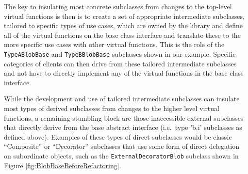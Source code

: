 \documentclass[pdf,ps2pdf,11pt]{SANDreport}
\begin{document}
The key to insulating most concrete subclasses from changes to the top-level
virtual functions is then is to create a set of appropriate intermediate
subclasses, tailored to specific types of use cases, which are owned by the
library and define all of the virtual functions on the base class interface
and translate these to the more specific use cases with other virtual
functions.  This is the role of the {}\texttt{Type\-A\-Blob\-Base} and
{}\texttt{Type\-B\-Blob\-Base} subclasses shown in our example.  Specific
categories of clients can then drive from these tailored intermediate
subclasses and not have to directly implement any of the virtual functions in
the base class interface.

While the development and use of tailored intermediate subclasses can insulate
most types of derived subclasses from changes to the higher level virtual
functions, a remaining stumbling block are those inaccessible external
subclasses that directly derive from the base abstract interface (i.e.\ type
'b.i' subclasses as defined above).  Examples of these types of direct
subclasses would be classic ``Composite'' or ``Decorator'' subclasses that use
some form of direct delegation on subordinate objects, such as the
{}\texttt{External\-Decorator\-Blob} subclass shown in Figure
{}\ref{fig:BlobBaseBeforeRefactoring}.
\end{document}
